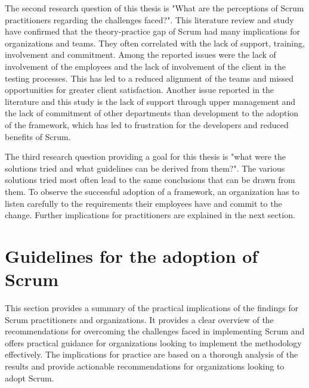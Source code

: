 The second research question of this thesis is "What are the perceptions of Scrum practitioners regarding the challenges faced?". This literature review and study have confirmed that the theory-practice gap of Scrum had many implications for organizations and teams. They often correlated with the lack of support, training, involvement and \gls{commitment}. Among the reported issues were the lack of involvement of the employees and the lack of involvement of the \gls{client} in the testing processes. This has led to a reduced alignment of the teams and missed opportunities for greater \gls{client} satisfaction. Another issue reported in the literature and this study is the lack of support through upper management and the lack of \gls{commitment} of other departments than development to the \gls{adoption} of the \gls{framework}, which has led to frustration for the \glspl{developer} and reduced benefits of Scrum.

The third research question providing a goal for this thesis is "what were the solutions tried and what guidelines can be derived from them?". The various solutions tried most often lead to the same conclusions that can be drawn from them. To observe the successful \gls{adoption} of a \gls{framework}, an organization has to listen carefully to the requirements their employees have and commit to the change. Further implications for practitioners are explained in the next section.

\newpage

\section{Guidelines for the adoption of Scrum}\label{sec:Implicationsforpractice}
This section provides a summary of the practical implications of the findings for Scrum practitioners and organizations. It provides a clear overview of the recommendations for overcoming the challenges faced in implementing Scrum and offers practical guidance for organizations looking to implement the \gls{methodology} effectively. The implications for practice are based on a thorough analysis of the results and provide actionable recommendations for organizations looking to adopt Scrum.

